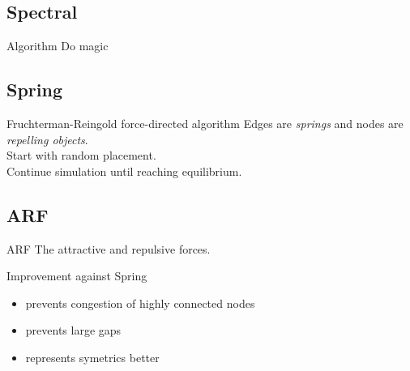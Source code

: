 \documentclass[11pt]{beamer}
\begin{document}
\subsection{Spectral}
\begin{frame}{\subsecname}
    \begin{block}{Algorithm}
        Do magic
    \end{block}

    \pause
    \resizebox{0.8\textwidth}{!}{}
\end{frame}

\subsection{Spring}
\begin{frame}{\subsecname}

    \begin{block}{Fruchterman-Reingold force-directed algorithm}
        Edges are \textit{springs} and nodes are \textit{repelling objects}.\\
        Start with random placement.\\
        Continue simulation until reaching equilibrium.
    \end{block}

\end{frame}

\begin{frame}{\subsecname}
    \resizebox{0.8\textwidth}{!}{}
\end{frame}

\subsection{ARF}
\begin{frame}{\subsecname}

    \begin{block}{ARF}
        The attractive and repulsive forces.
    \end{block}

    \pause
    \begin{block}{Improvement against Spring}
        \begin{itemize}
            \pause
            \item prevents congestion of highly connected nodes
            \pause
            \item prevents large gaps
            \pause
            \item represents symetrics better
        \end{itemize}
    \end{block}

\end{frame}
\end{document}
